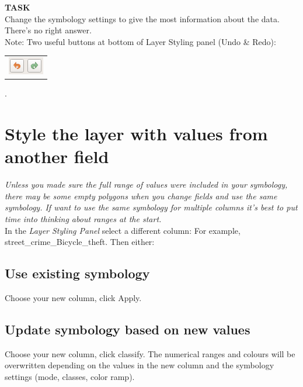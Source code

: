 
\textbf{TASK}\\
Change the symbology settings to give the most information about the data. There’s no right answer.\\

Note: Two useful buttons at bottom of Layer Styling panel (Undo \& Redo):            
\begin{tabular}{@{}c@{}}\includegraphics[width=4ex]{images/styling_redo_undo_icon.png}\end{tabular}.\\


\section{Style the layer with values from another field}

\textit{Unless you made sure the full range of values were included in your symbology, there may be some empty polygons when you change fields and use the same symbology. If want to use the same symbology for multiple columns it’s best to put time into thinking about ranges at the start.}\\

In the \textit{Layer Styling Panel} select a different column: For example, street\_crime\_Bicycle\_theft. Then either:\\

\subsection{Use existing symbology}
Choose your new column, click Apply.\\

\subsection{Update symbology based on new values}
Choose your new column, click classify. The numerical ranges and colours will be overwritten depending on the values in the new column and the symbology settings (mode, classes, color ramp).\\ 


